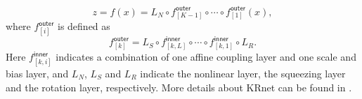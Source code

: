 \begin{equation}\label{krnet_expr}
z = f(x) = L_{N} \circ f_{[K-1]}^{\textsf{outer}} \circ \cdots \circ f_{[1]}^{\textsf{outer}} (x),
\end{equation}
where $f_{[i]}^{\textsf{outer}}$ is defined as
\begin{equation}
f_{[k]}^{\textsf{outer}} = L_S \circ f_{[k, L]}^{\textsf{inner}} \circ \cdots \circ f_{[k,1]}^{\textsf{inner}} \circ L_R.
\end{equation}
Here $f_{[k,i]}^{\textsf{inner}}$ indicates a combination of one affine coupling layer and one scale and bias layer, and $L_N$, $L_S$ and $L_R$ indicate the nonlinear layer, the squeezing layer and the rotation layer, respectively.
More details about KRnet can be found in \cite{tang2020deep,adda_2022}.
